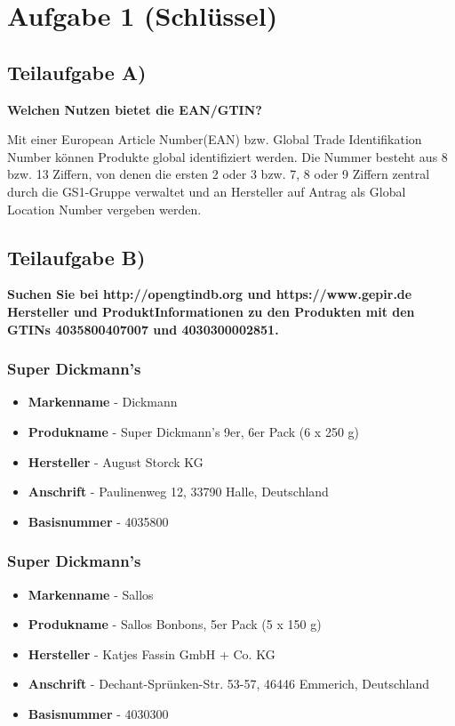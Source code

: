 \section{Aufgabe 1 (Schlüssel)}

\subsection{Teilaufgabe A)}
\textbf{Welchen Nutzen bietet die EAN/GTIN?}

Mit einer European Article Number(EAN) bzw. Global Trade Identifikation Number 
können Produkte global identifiziert werden. Die Nummer besteht aus 8 bzw. 13
Ziffern, von denen die ersten 2 oder 3 bzw. 7, 8 oder 9 Ziffern zentral durch die GS1-Gruppe verwaltet
und an Hersteller auf Antrag als Global Location Number vergeben werden.
\subsection{Teilaufgabe B)}
\textbf{Suchen Sie bei http://opengtindb.org und https://www.gepir.de Hersteller und ProduktInformationen
zu den Produkten mit den GTINs 4035800407007 und 4030300002851.}
\subsubsection{Super Dickmann's}

\begin{itemize}
  \item \textbf{Markenname} - {Dickmann}
  \item \textbf{Produkname} - {Super Dickmann's 9er, 6er Pack (6 x 250 g)}
  \item \textbf{Hersteller} - {August Storck KG}
  \item \textbf{Anschrift} - {Paulinenweg 12,
33790 Halle,
Deutschland}
\item \textbf{Basisnummer} - {4035800}
\end{itemize}

\subsubsection{Super Dickmann's}

\begin{itemize}
  \item \textbf{Markenname} - {Sallos}
  \item \textbf{Produkname} - {Sallos Bonbons, 5er Pack (5 x 150 g)}
  \item \textbf{Hersteller} - {Katjes Fassin GmbH + Co. KG}
  \item \textbf{Anschrift} - {Dechant-Sprünken-Str. 53-57,
46446 Emmerich,
Deutschland}
\item \textbf{Basisnummer} - {4030300}
\end{itemize}

